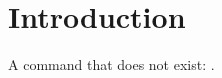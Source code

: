 \documentclass{article}
\begin{document}
\section{Introduction}
A command that does not exist: .
\end{document}
